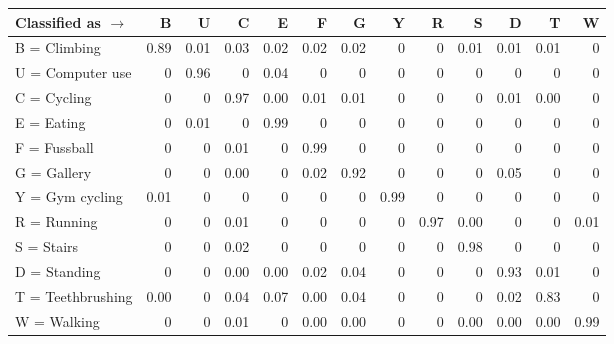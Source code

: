 \begin{tabular}{lrrrrrrrrrrrr}
\toprule
Classified as $\rightarrow$ &    B &    U &    C &    E &    F &    G &    Y &    R &    S &    D &    T &    W \\
\midrule
B = Climbing      & 0.89 & 0.01 & 0.03 & 0.02 & 0.02 & 0.02 &  0 &  0 & 0.01 & 0.01 & 0.01 &  0 \\
U = Computer use  &  0 & 0.96 &  0 & 0.04 &  0 &  0 &  0 &  0 &  0 &  0 &  0 &  0 \\
C = Cycling       &  0 &  0 & 0.97 & 0.00 & 0.01 & 0.01 &  0 &  0 &  0 & 0.01 & 0.00 &  0 \\
E = Eating        &  0 & 0.01 &  0 & 0.99 &  0 &  0 &  0 &  0 &  0 &  0 &  0 &  0 \\
F = Fussball      &  0 &  0 & 0.01 &  0 & 0.99 &  0 &  0 &  0 &  0 &  0 &  0 &  0 \\
G = Gallery       &  0 &  0 & 0.00 &  0 & 0.02 & 0.92 &  0 &  0 &  0 & 0.05 &  0 &  0 \\
Y = Gym cycling   & 0.01 &  0 &  0 &  0 &  0 &  0 & 0.99 &  0 &  0 &  0 &  0 &  0 \\
R = Running       &  0 &  0 & 0.01 &  0 &  0 &  0 &  0 & 0.97 & 0.00 &  0 &  0 & 0.01 \\
S = Stairs        &  0 &  0 & 0.02 &  0 &  0 &  0 &  0 &  0 & 0.98 &  0 &  0 &  0 \\
D = Standing      &  0 &  0 & 0.00 & 0.00 & 0.02 & 0.04 &  0 &  0 &  0 & 0.93 & 0.01 &  0 \\
T = Teethbrushing & 0.00 &  0 & 0.04 & 0.07 & 0.00 & 0.04 &  0 &  0 &  0 & 0.02 & 0.83 &  0 \\
W = Walking       &  0 &  0 & 0.01 &  0 & 0.00 & 0.00 &  0 &  0 & 0.00 & 0.00 & 0.00 & 0.99 \\
\bottomrule
\end{tabular}
